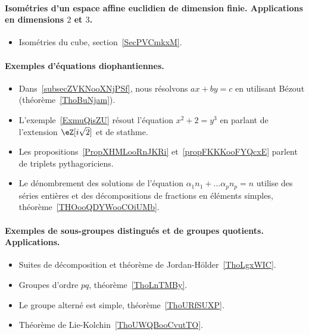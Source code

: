 \paragraph{Isométries d'un espace affine euclidien de dimension finie. Applications en dimensions \( 2\) et \( 3\).}
\begin{itemize}
	\item Isométries du cube, section~\ref{SecPVCmkxM}.
\end{itemize}
\paragraph{Exemples d’équations diophantiennes.}
\begin{itemize}
	\item Dans~\ref{subsecZVKNooXNjPSf}, nous résolvons \( ax+by=c\) en utilisant Bézout (théorème~\ref{ThoBuNjam}).
	\item L'exemple~\ref{ExmuQisZU} résout l'équation \( x^2+2=y^3\) en parlant de l'extension \( \eZ[i\sqrt{2}]\) et de stathme.
	\item Les propositions~\ref{PropXHMLooRnJKRi} et~\ref{propFKKKooFYQcxE} parlent de triplets pythagoriciens.
	\item Le dénombrement des solutions de l'équation \( \alpha_1 n_1+\ldots \alpha_pn_p=n\) utilise des séries entières et des décompositions de fractions en éléments simples, théorème~\ref{THOooQDYWooCOiUMb}.
\end{itemize}
\paragraph{Exemples de sous-groupes distingués et de groupes quotients. Applications.}
\begin{itemize}
	\item Suites de décomposition et théorème de Jordan-Hölder~\ref{ThoLgxWIC}.
	\item Groupes d'ordre \( pq\), théorème~\ref{ThoLnTMBy}.
	\item Le groupe alterné est simple, théorème~\ref{ThoURfSUXP}.
	\item Théorème de Lie-Kolchin~\ref{ThoUWQBooCvutTO}.
\end{itemize}
